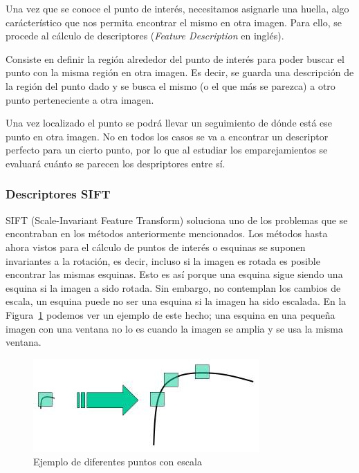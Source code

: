 Una vez que se conoce el punto de interés, necesitamos asignarle una huella, algo carácterístico que nos permita encontrar el mismo en otra imagen. Para ello, se procede al cálculo de descriptores (\textit{Feature Description} en inglés).

Consiste en definir la región alrededor del punto de interés para poder buscar el punto con la misma región en otra imagen. Es decir, se guarda una descripción de la región del punto dado y se busca el mismo (o el que más se parezca) a otro punto perteneciente a otra imagen.

Una vez localizado el punto se podrá llevar un seguimiento de dónde está ese punto en otra imagen. No en todos los casos se va a encontrar un descriptor perfecto para un cierto punto, por lo que al estudiar los emparejamientos se evaluará cuánto se parecen los despriptores entre sí.

\subsubsection{Descriptores SIFT}

SIFT (Scale-Invariant Feature Transform) soluciona uno de los problemas que se encontraban en los métodos anteriormente mencionados. Los métodos hasta ahora vistos para el cálculo de puntos de interés o esquinas se suponen invariantes a la rotación, es decir, incluso si la imagen es rotada es posible encontrar las mismas esquinas. Esto es así porque una esquina sigue siendo una esquina si la imagen a sido rotada. Sin embargo, no contemplan los cambios de escala, un esquina puede no ser una esquina si la imagen ha sido escalada. En la Figura~\ref{fig:sift_scale_invariant} podemos ver un ejemplo de este hecho; una esquina en una pequeña imagen con una ventana no lo es cuando la imagen se amplia y se usa la misma ventana.

\begin{figure}[ht]
\centering
\includegraphics[scale=0.8]{Figures/sift_scale_invariant.jpg}
\decoRule
\caption[Ejemplo de sistema escalarmente variante]{Ejemplo de diferentes puntos con escala}
\label{fig:sift_scale_invariant}
\end{figure}

